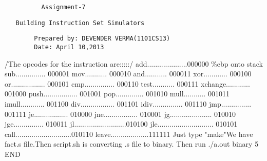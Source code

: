 \documentclass{article}
\begin{document}
\begingroup
	\fontsize{50pt}{12pt}\selectfont
	\begin{verbatim}
          Assignment-7
	\end{verbatim}
        \fontsize{22pt}{25pt}\selectfont
        \begin{verbatim}
   Building Instruction Set Simulators
        \end{verbatim}
	\fontsize{18pt}{21.6pt}\selectfont
	\begin{verbatim}
		Prepared by: DEVENDER VERMA(1101CS13)
		Date: April 10,2013
	\end{verbatim}
\endgroup
	/The opcodes for the instruction are:::::/\newline
	add....................000000 \%ebp onto stack\newline
	sub............... 000001\newline
	mov........... 000010\newline
	and........... 000011\newline
	xor............ 000100\newline
	or................. 000101\newline
	cmp............... 000110\newline
	test........... 000111\newline
	xchange............ 001000\newline
	push................. 001001\newline
	pop.............. 001010\newline
	mull........... 001011\newline
	imull............ 001100\newline
	div................. 001101\newline
	idiv............... 001110\newline
	jmp............... 001111\newline
	je................. 010000\newline
	jne................. 010001\newline
	jg..................... 010010\newline
	jge............... 010011\newline
	jl..........................010100\newline
	jle............................ 010101\newline
	call............................010110\newline
	leave...................111111\newline
Just type "make"\newline We have fact.s file.Then script.sh is converting .s file to binary.\newline
\newline
Then run ./a.out binary 5\newline
\newline
END
\end{document}
